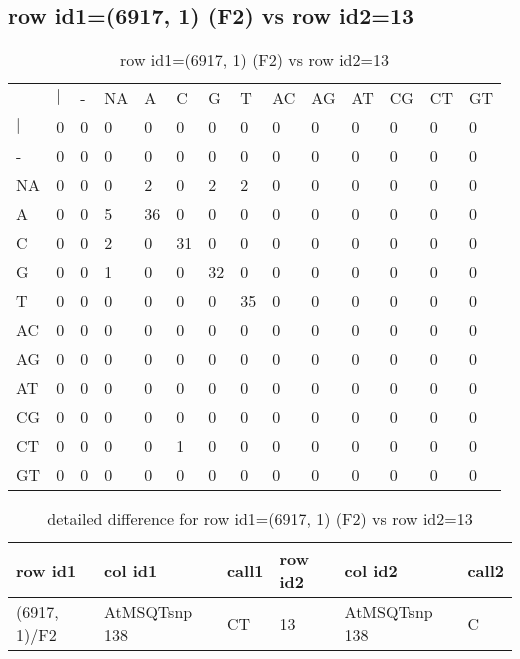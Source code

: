 \subsection{row id1=(6917, 1) (F2) vs row id2=13}
\begin{center}
\begin{longtable}{|l|l|l|l|l|l|l|l|l|l|l|l|l|l|}
\caption{row id1=(6917, 1) (F2) vs row id2=13} \label{table_dm96}\\
\hline
\\
\hline
&$|$&-&NA&A&C&G&T&AC&AG&AT&CG&CT&GT\\
$|$&0&0&0&0&0&0&0&0&0&0&0&0&0\\
-&0&0&0&0&0&0&0&0&0&0&0&0&0\\
NA&0&0&0&2&0&2&2&0&0&0&0&0&0\\
A&0&0&5&36&0&0&0&0&0&0&0&0&0\\
C&0&0&2&0&31&0&0&0&0&0&0&0&0\\
G&0&0&1&0&0&32&0&0&0&0&0&0&0\\
T&0&0&0&0&0&0&35&0&0&0&0&0&0\\
AC&0&0&0&0&0&0&0&0&0&0&0&0&0\\
AG&0&0&0&0&0&0&0&0&0&0&0&0&0\\
AT&0&0&0&0&0&0&0&0&0&0&0&0&0\\
CG&0&0&0&0&0&0&0&0&0&0&0&0&0\\
CT&0&0&0&0&1&0&0&0&0&0&0&0&0\\
GT&0&0&0&0&0&0&0&0&0&0&0&0&0\\
\hline
\end{longtable}
\end{center}

\begin{center}
\begin{longtable}{|l|l|l|l|l|l|}
\caption{detailed difference for row id1=(6917, 1) (F2) vs row id2=13} \label{table_dm97}\\
\hline
row id1&col id1&call1&row id2&col id2&call2\\
\hline
(6917, 1)/F2&AtMSQTsnp 138&CT&13&AtMSQTsnp 138&C\\
\hline
\end{longtable}
\end{center}


